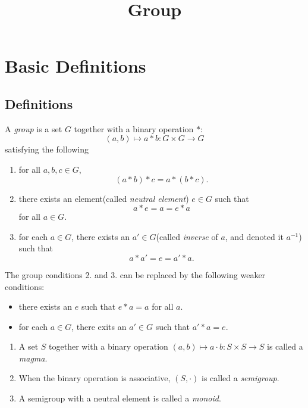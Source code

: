 



\title{Group}
\label{chapter-group}

\tableofcontents

\section{Basic Definitions}
\label{section-basic-definitions}

\subsection{Definitions}
\label{subsection-definitions}

\begin{definition}
  \label{definition-group}
  A \emph{group} is a set \( G \) together with a binary operation \( * \):
  \[
    (a, b) \mapsto a * b: G \times G \to G
  \]
  satisfying the following
  \begin{enumerate}
    \item for all \( a, b, c \in G \),
      \[
        (a * b) * c = a * (b * c).
      \]
    \item there exists an element(called \emph{neutral element}) \( e \in G \) such that
      \[
        a * e = a = e * a
      \]
      for all \( a \in G \).
    \item for each \( a \in G \), there exists an \( a' \in G \)(called \emph{inverse} of \( a \), and denoted it \( a^{-1} \)) such that
      \[
         a * a' = e = a' * a.
      \]
  \end{enumerate}
\end{definition}
\begin{remark}
  \label{remark-alternate-group-definition}
  The group conditions 2. and 3. can be replaced by the following weaker conditions:
  \begin{itemize}
    \item there exists an \( e \) such that \( e * a = a \) for all \( a \).
    \item for each \( a \in G \), there exits an \( a' \in G \) such that \( a' * a = e \).
  \end{itemize}
\end{remark}

\begin{definition}
  \label{definition-magma}
  \label{definition-semigroup}
  \label{definition-monoid}
  \begin{enumerate}
    \item A set \( S \) together with a binary operation \( (a, b) \mapsto a \cdot b: S \times S \to S \) is called a \emph{magma}.
    \item When the binary operation is associative, \( (S, \cdot) \) is called a \emph{semigroup}.
    \item A semigroup with a neutral element is called a \emph{monoid}.
  \end{enumerate}
\end{definition}

